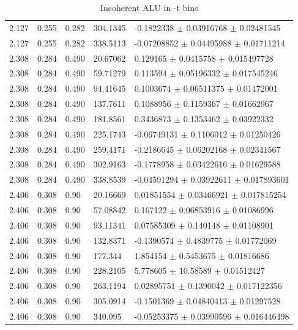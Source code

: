 \begin{table}[!h]
\begin{center}
\begin{tabular}{||l|l|l|l|l||}
  2.127 & 0.255 & 0.282  &   304.1345  &  -0.1822338   $\pm$ 0.03916768    $\pm$  0.02481545    \\
  2.127 & 0.255 & 0.282  &   338.5113  &  -0.07208852  $\pm$ 0.04495988    $\pm$  0.01711214    \\
 \hline                                                                          
  2.308 & 0.284 & 0.490 &    20.67062  &  0.129165     $\pm$ 0.0415758     $\pm$  0.015497728  \\
  2.308 & 0.284 & 0.490 &    59.71279  &  0.113594     $\pm$ 0.05196332    $\pm$  0.017545246  \\
  2.308 & 0.284 & 0.490 &    94.41645  &  0.1003674    $\pm$ 0.06511375    $\pm$  0.01472001   \\
  2.308 & 0.284 & 0.490 &    137.7611  &  0.1088956    $\pm$ 0.1159367     $\pm$  0.01662967   \\
  2.308 & 0.284 & 0.490 &    181.8561  &  0.3436873    $\pm$ 0.1353462     $\pm$  0.03922332   \\
  2.308 & 0.284 & 0.490 &    225.1743  &  -0.06749131  $\pm$ 0.1106012     $\pm$  0.01250426   \\
  2.308 & 0.284 & 0.490 &    259.4171  &  -0.2186645   $\pm$ 0.06202168    $\pm$  0.02341567   \\
  2.308 & 0.284 & 0.490 &    302.9163  &  -0.1778958   $\pm$ 0.03422616    $\pm$  0.01629588   \\
  2.308 & 0.284 & 0.490 &    338.8539  &  -0.04591294  $\pm$ 0.03922611    $\pm$  0.017893601  \\
 \hline                         
   2.406 & 0.308 & 0.90 &    20.16669  &  0.01851554   $\pm$ 0.03466921    $\pm$ 0.017815254  \\
   2.406 & 0.308 & 0.90 &    57.08842  &  0.167122     $\pm$ 0.06853916    $\pm$ 0.01086996   \\
   2.406 & 0.308 & 0.90 &    93.11341  &  0.07585309   $\pm$ 0.140148      $\pm$ 0.01108901   \\
   2.406 & 0.308 & 0.90 &    132.8371  &  -0.1390574   $\pm$ 0.4839775     $\pm$ 0.01772069   \\
   2.406 & 0.308 & 0.90 &    177.344   &  1.854154     $\pm$ 0.5453675     $\pm$ 0.01816686   \\ 
   2.406 & 0.308 & 0.90 &    228.2105  &  5.778605     $\pm$ 10.58589      $\pm$ 0.01512427   \\
   2.406 & 0.308 & 0.90 &    263.1194  &  0.02895751   $\pm$ 0.1390042     $\pm$ 0.017122356  \\
   2.406 & 0.308 & 0.90 &    305.0914  &  -0.1501369   $\pm$ 0.04840413    $\pm$ 0.01297528   \\
   2.406 & 0.308 & 0.90 &    340.095   &  -0.05253375  $\pm$ 0.03990596    $\pm$ 0.016446498  \\
 \hline
 \hline
 \end{tabular}
 \caption{Incoherent ALU in -t bins}
 \label{table:InCoh_t_BSA}
 \end{center}
\end{table}                                                                                                   

